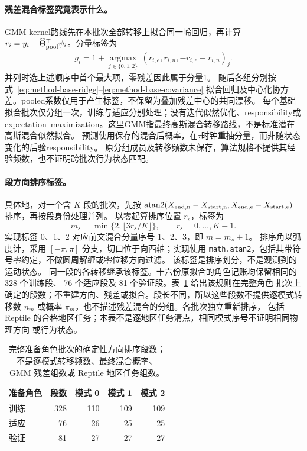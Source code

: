 \documentclass[UTF8,11pt]{ctexart}
\begin{document}
\paragraph{残差混合标签究竟表示什么。}
\label{sec:residual-mixture-fit}
GMM-kernel路线先在本批次全部转移上拟合同一岭回归，再计算
\(r_i=y_i-\widehat\Theta_{\rm pool}^\top\psi_i\)。分量标签为
\begin{align}
 g_i=1+\underset{j\in\{0,1,2\}}{\operatorname{argmax}}\,
       (r_{i,e},r_{i,n},-r_{i,e}-r_{i,n})_j .
 \label{eq:gmm-residual-partition}
\end{align}
并列时选上述顺序中首个最大项，零残差因此属于分量1。
随后各组分别按式~\eqref{eq:method-base-ridge}--\eqref{eq:method-base-covariance}
拟合回归及中心化协方差。pooled系数仅用于产生标签，不保留为叠加残差中心的共同漂移。
每个基础拟合批次仅分组一次，训练与适应分别处理；没有迭代似然优化、responsibility或
expectation--maximization。这里GMM指最终高斯混合转移路线，不是标准潜在高斯混合似然拟合。
预测使用保存的混合后概率，在\(\tau\)时钟重抽分量，而非随状态变化的后验responsibility。
原分组成员及转移频数未保存，算法规格不提供其经验频数，也不证明跨批次行为状态匹配。

\paragraph{段方向排序标签。}
具体地，对一个含 \(K\) 段的批次，先按
\(\operatorname{atan2}(X_{\rm end,n}-X_{\rm start,n},
X_{\rm end,e}-X_{\rm start,e})\) 排序，再按段身份处理并列。
以零起算排序位置 \(r_s\)，标签为
\begin{equation}
m_s=\min\{2,\lfloor 3r_s/K\rfloor\},\qquad r_s=0,\ldots,K-1.
\label{eq:segment-rank-mode}
\end{equation}
实现标签 0、1、2 对应前文混合分量序号 1、2、3，即 \(m=m_s+1\)。
排序角以弧度计，采用 \([-\pi,\pi]\) 分支，切口位于向西轴；实现使用
\texttt{math.atan2}，包括其带符号零约定，不做圆周解缠或零位移方向过滤。
该标签是排序划分，不是观测到的运动状态。
同一段的各转移继承该标签。十六份原拟合的角色记账均保留相同的 328 个训练段、
76 个适应段及 81 个验证段。表~\ref{tab:mode-rank-cardinality} 给出该规则在完整角色
批次上确定的段数；不重建方向、残差或拟合。段长不同，所以这些段数不提供逐模式转移数
\(n_m\) 或概率 \(\pi_m\)，也不描述残差混合的分组。各批次独立重新排序，
包括 Reptile 的合格地区任务；本表不是逐地区任务清点，相同模式序号不证明相同物理方向
或行为状态。

\begin{table}[htbp]
\centering\small
\caption{完整准备角色批次的确定性方向排序段数；不是逐模式转移频数、最终混合概率、
GMM 残差组数或 Reptile 地区任务组数。}
\label{tab:mode-rank-cardinality}
\begin{tabular}{lrrrr}
\toprule
准备角色 & 段数 & 模式 0 & 模式 1 & 模式 2\\
\midrule
训练 & 328 & 110 & 109 & 109\\
适应 & 76 & 26 & 25 & 25\\
验证 & 81 & 27 & 27 & 27\\
\bottomrule
\end{tabular}
\end{table}
\end{document}
